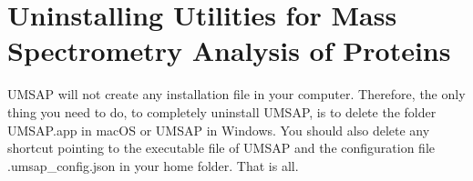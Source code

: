 \section{Uninstalling Utilities for Mass Spectrometry Analysis of Proteins}

UMSAP will not create any installation file in your computer. Therefore, the only
thing you need to do, to completely uninstall UMSAP, is to delete the folder
UMSAP.app in macOS or UMSAP in Windows. You should also delete any shortcut
pointing to the executable file of UMSAP and the configuration file
.umsap\_config.json in your home folder. That is all.